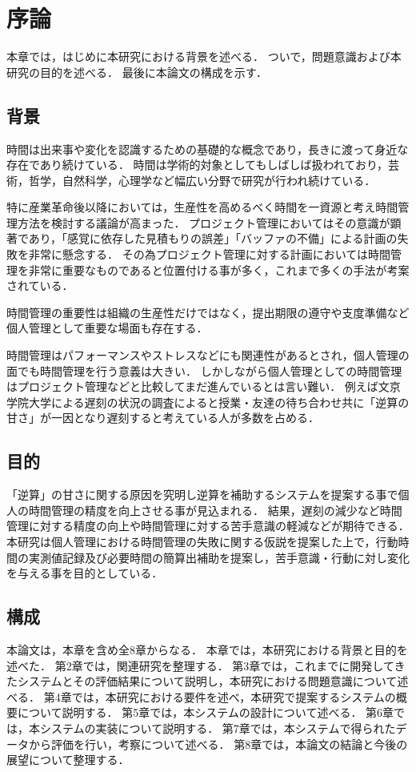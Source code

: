 \chapter{序論}
本章では，はじめに本研究における背景を述べる．
ついで，問題意識および本研究の目的を述べる．
最後に本論文の構成を示す．

\section{背景}
時間は出来事や変化を認識するための基礎的な概念であり，長きに渡って身近な存在であり続けている\cite{history}．
時間は学術的対象としてもしばしば扱われており，芸術，哲学，自然科学，心理学など幅広い分野で研究が行われ続けている．

特に産業革命後以降においては，生産性を高めるべく時間を一資源と考え時間管理方法を検討する議論が高まった\cite{Taylor1911}．
プロジェクト管理においてはその意識が顕著であり，「感覚に依存した見積もりの誤差」「バッファの不備」による計画の失敗を非常に懸念する\cite{innopm}．
その為プロジェクト管理に対する計画においては時間管理を非常に重要なものであると位置付ける事が多く，これまで多くの手法が考案されている\cite{EORMS}．

時間管理の重要性は組織の生産性だけではなく，提出期限の遵守や支度準備など個人管理として重要な場面も存在する．

時間管理はパフォーマンス\cite{Barling1996}\cite{Britton1991}\cite{Trueman1996}やストレス\cite{Macan1994}などにも関連性があるとされ，個人管理の面でも時間管理を行う意義は大きい\cite{Claessens2007}．
しかしながら個人管理としての時間管理はプロジェクト管理などと比較してまだ進んでいるとは言い難い．
例えば文京学院大学による遅刻の状況の調査によると授業・友達の待ち合わせ共に「逆算の甘さ」が一因となり遅刻すると考えている人が多数を占める\cite{bunkyo}．

\section{目的}
「逆算」の甘さに関する原因を究明し逆算を補助するシステムを提案する事で個人の時間管理の精度を向上させる事が見込まれる．
結果，遅刻の減少など時間管理に対する精度の向上や時間管理に対する苦手意識の軽減などが期待できる．
本研究は個人管理における時間管理の失敗に関する仮説を提案した上で，行動時間の実測値記録及び必要時間の簡算出補助を提案し，苦手意識・行動に対し変化を与える事を目的としている．

\section{構成}
本論文は，本章を含め全8章からなる．
本章では，本研究における背景と目的を述べた．
第2章では，関連研究を整理する．
第3章では，これまでに開発してきたシステムとその評価結果について説明し，本研究における問題意識について述べる．
第4章では，本研究における要件を述べ，本研究で提案するシステムの概要について説明する．
第5章では，本システムの設計について述べる．
第6章では，本システムの実装について説明する．
第7章では，本システムで得られたデータから評価を行い，考察について述べる．
第8章では，本論文の結論と今後の展望について整理する．